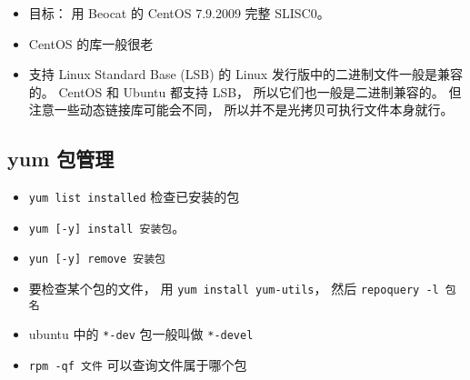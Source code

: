 
\begin{issues}
\issueDraft
\end{issues}

\begin{itemize}
\item 目标： 用 Beocat 的 CentOS 7.9.2009 完整 SLISC0。
\item CentOS 的库一般很老
\item 支持 Linux Standard Base (LSB) 的 Linux 发行版中的二进制文件一般是兼容的。 CentOS 和 Ubuntu 都支持 LSB， 所以它们也一般是二进制兼容的。 但注意一些动态链接库可能会不同， 所以并不是光拷贝可执行文件本身就行。
\end{itemize}

\subsection{yum 包管理}
\begin{itemize}
\item \verb|yum list installed| 检查已安装的包
\item \verb|yum [-y] install 安装包|。
\item \verb|yun [-y] remove 安装包|
\item 要检查某个包的文件， 用 \verb|yum install yum-utils|， 然后 \verb|repoquery -l 包名|
\item ubuntu 中的 \verb|*-dev| 包一般叫做 \verb|*-devel|
\item \verb|rpm -qf 文件| 可以查询文件属于哪个包
\end{itemize}

